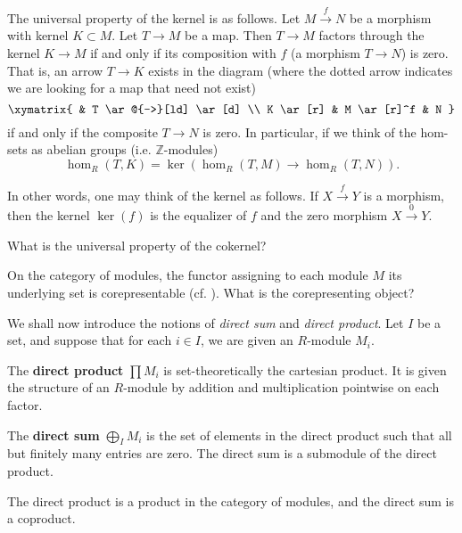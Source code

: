 \begin{exercise} \label{univpropertykernel} 
The universal property of the kernel is as follows. Let $M \stackrel{f}{\to }
N$ be a morphism with kernel $K \subset M$. Let $T \to M$ be a map. Then $T \to M$ factors through the
kernel $K \to M$ if and only if its composition with $f$ (a morphism $T \to N$) is zero. 
That is, an arrow $T \to K$ exists in the diagram (where the dotted arrow
indicates we are looking for a map that need not exist)
\[ \xymatrix{
& T \ar@{-->}[ld] \ar[d]  \\
K \ar[r] &  M \ar[r]^f &  N
}\]
if and only if the composite $T \to N$ is zero.
In particular, if we think of the hom-sets as abelian groups (i.e.
$\mathbb{Z}$-modules)
\[ \hom_R( T,K) = \ker\left( \hom_R(T, M) \to \hom_R(T, N) \right). \]
\end{exercise}

In other words, one may think of the kernel as follows. If $X
\stackrel{f}{\to} Y$ is a morphism, then the kernel $\ker(f)$ is the equalizer
of $f$ and the zero morphism $X \stackrel{0}{\to} Y$.

\begin{exercise} 
What is the universal property of the cokernel?
\end{exercise} 

\begin{exercise} \label{moduleunderlyingsetrepresentable}
On the category of modules, the functor assigning to each module $M$ its
underlying set is corepresentable (cf. ). What
is the corepresenting object? 
\end{exercise} 

We shall now introduce the notions of \emph{direct sum} and \emph{direct
product}. Let $I$ be a set, and suppose that for each $i \in I$, we are given
an $R$-module $M_i$.

\begin{definition} 
The \textbf{direct product} $\prod M_i$ is set-theoretically the cartesian product. It is given
the structure of an $R$-module by addition and multiplication pointwise on
each factor. 
\end{definition} 
\begin{definition} 
The \textbf{direct sum} $\bigoplus_I M_i$ is the set of elements in the direct
product such that all but finitely many entries are zero. The direct sum is a
submodule of the direct product.
\end{definition} 


\begin{exercise} \label{productcoproduct}
The direct product is a product in the category of modules, and the direct sum
is a coproduct.
\end{exercise} 

